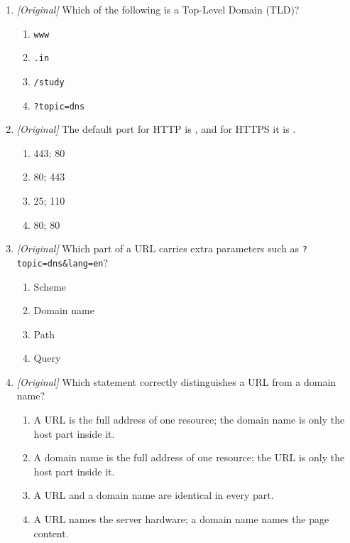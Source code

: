 \begin{enumerate}[label=\textbf{Q\arabic*.}, leftmargin=*]
\begin{enumerate}[label=\Alph*.]
    \item \texttt{mail}
    \item \texttt{mailto}
  \end{enumerate}
\item \textit{[Original]} Which of the following is a Top-Level Domain
  (TLD)?
  \begin{enumerate}[label=\Alph*.]
    \item \texttt{www}
    \item \texttt{.in}
    \item \texttt{/study}
    \item \texttt{?topic=dns}
  \end{enumerate}
\item \textit{[Original]} The default port for HTTP is
  \underline{\hspace{1.2cm}}, and for HTTPS it is
  \underline{\hspace{1.2cm}}.
  \begin{enumerate}[label=\Alph*.]
    \item 443; 80
    \item 80; 443
    \item 25; 110
    \item 80; 80
  \end{enumerate}
\item \textit{[Original]} Which part of a URL carries extra parameters such
  as \texttt{?topic=dns\&lang=en}?
  \begin{enumerate}[label=\Alph*.]
    \item Scheme
    \item Domain name
    \item Path
    \item Query
  \end{enumerate}
\item \textit{[Original]} Which statement correctly distinguishes a URL from
  a domain name?
  \begin{enumerate}[label=\Alph*.]
    \item A URL is the full address of one resource; the domain name is only
      the host part inside it.
    \item A domain name is the full address of one resource; the URL is only
      the host part inside it.
    \item A URL and a domain name are identical in every part.
    \item A URL names the server hardware; a domain name names the page
      content.
  \end{enumerate}

\end{enumerate}
